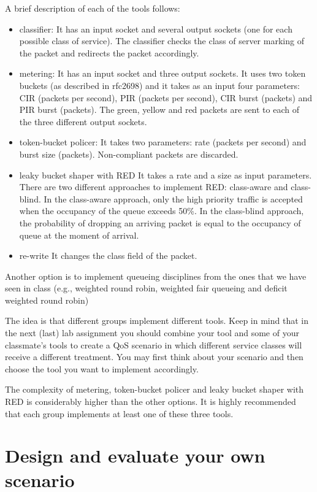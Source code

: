 A brief description of each of the tools follows:
\begin{itemize}
  \item{classifier:}
  It has an input socket and several output sockets (one for each possible class of service).
  The classifier checks the class of server marking of the packet and redirects the packet accordingly.
  \item{metering:}
  It has an input socket and three output sockets.
  It uses two token buckets (as described in rfc2698) and it takes as an input four parameters: CIR (packets per second), PIR (packets per second), CIR burst (packets) and PIR burst (packets).
  The green, yellow and red packets are sent to each of the three different output sockets.
  \item{token-bucket policer:}
  It takes two parameters: rate (packets per second) and burst size (packets).
  Non-compliant packets are discarded.
  \item{leaky bucket shaper with RED}
  It takes a rate and a size as input parameters.
  There are two different approaches to implement RED: class-aware and class-blind.
  In the class-aware approach, only the high priority traffic is accepted when the occupancy of the queue exceeds 50\%.
  In the class-blind approach, the probability of dropping an arriving packet is equal to the occupancy of queue at the moment of arrival.
  \item{re-write}
  It changes the class field of the packet.
\end{itemize}

Another option is to implement queueing disciplines from the ones that we have seen in class (e.g., weighted round robin, weighted fair queueing and deficit weighted round robin)

The idea is that different groups implement different tools.
Keep in mind that in the next (last) lab assignment you should combine your tool and some of your classmate's tools to create a QoS scenario in which different service classes will receive a different treatment.
You may first think about your scenario and then choose the tool you want to implement accordingly.

The complexity of metering, token-bucket policer and leaky bucket shaper with RED is considerably higher than the other options.
It is highly recommended that each group implements at least one of these three tools.

\section{Design and evaluate your own scenario}

